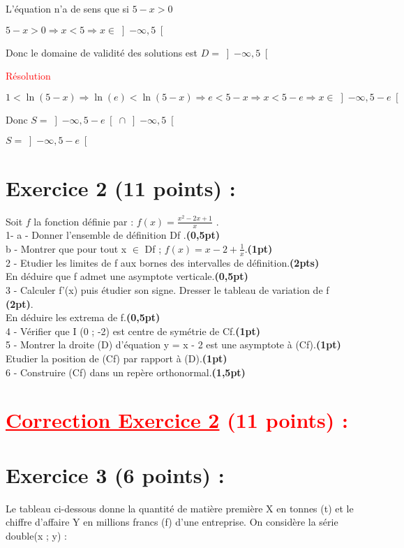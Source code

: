 \documentclass[12pt]{article}
\begin{document}
L'équation n'a de sens que si  $5-x>0$

$5-x>0 \Rightarrow x<5 \Rightarrow x \in \left]-\infty, 5\right[ $

Donc le domaine de validité des solutions est $D=\left]-\infty, 5\right[$

\textcolor{red}{Résolution}


$1<\ln(5-x) \Rightarrow \ln(e)<\ln(5-x) \Rightarrow e<5-x \Rightarrow x<5-e \Rightarrow x \in \left]-\infty, 5-e\right[$

Donc $S=\left]-\infty, 5-e\right[\cap\left]-\infty,5\right[$

$S=\left]-\infty, 5-e\right[$
\section*{Exercice 2 (11 points) :}
Soit  $f$  la fonction définie par : $f(x) =\frac{x^{2}-2x+1}{x}$ .\\
    1- a - Donner  l’ensemble de définition  Df .\textbf{(0,5pt)}\\
b - Montrer que pour tout x $\in$ Df ; $f(x) =x-2+\frac{1}{x} $.\textbf{(1pt)}\\
       2  - Etudier les limites de f aux bornes des intervalles de définition.\textbf{(2pts)}\\ 
              En déduire que f admet une asymptote verticale.\textbf{(0,5pt)}\\
       3 - Calculer  f'(x) puis étudier son signe. Dresser le tableau de variation de f \textbf{(2pt)}.\\
             En déduire les extrema  de f.\textbf{(0,5pt)}\\
        4 - Vérifier que  I (0 ; -2) est centre de symétrie de Cf.\textbf{(1pt)} \\
        5 -  Montrer la droite (D) d’équation  y = x - 2  est une asymptote à (Cf).\textbf{(1pt)} \\
             Etudier la position de (Cf) par rapport à (D).\textbf{(1pt)}\\
         6 - Construire (Cf) dans un repère orthonormal.\textbf{(1,5pt)}\\
\section*{\textcolor{red}{\underline{Correction Exercice 2} (11 points) :}}
\section*{Exercice 3 (6 points) :}
Le tableau ci-dessous  donne la quantité de matière première X en tonnes (t) et le chiffre d’affaire Y en millions francs (f) d’une entreprise. On considère  la série double(x ; y) :
\end{document}
